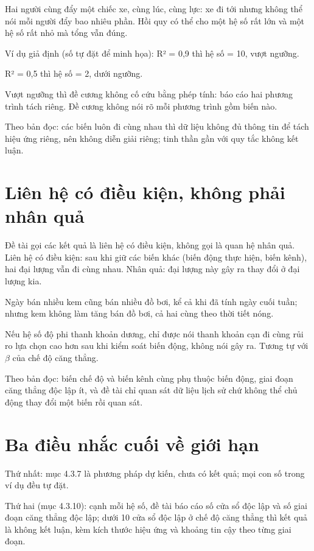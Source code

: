 Hai người cùng đẩy một chiếc xe, cùng lúc, cùng lực: xe đi tới nhưng không thể nói mỗi người đẩy bao nhiêu phần. Hồi quy có thể cho một hệ số rất lớn và một hệ số rất nhỏ mà tổng vẫn đúng.

\begin{tcolorbox}[breakable]
Ví dụ giả định (số tự đặt để minh họa): R² = 0,9 thì hệ số = 10, vượt ngưỡng.

R² = 0,5 thì hệ số = 2, dưới ngưỡng.
\end{tcolorbox}

Vượt ngưỡng thì đề cương không cố cứu bằng phép tính: báo cáo hai phương trình tách riêng. Đề cương không nói rõ mỗi phương trình gồm biến nào.

Theo bản đọc: các biến luôn đi cùng nhau thì dữ liệu không đủ thông tin để tách hiệu ứng riêng, nên không diễn giải riêng; tinh thần gần với quy tắc không kết luận.

\section{Liên hệ có điều kiện, không phải nhân quả}

Đề tài gọi các kết quả là liên hệ có điều kiện, không gọi là quan hệ nhân quả. Liên hệ có điều kiện: sau khi giữ các biến khác (biến động thực hiện, biến kênh), hai đại lượng vẫn đi cùng nhau. Nhân quả: đại lượng này gây ra thay đổi ở đại lượng kia.

Ngày bán nhiều kem cũng bán nhiều đồ bơi, kể cả khi đã tính ngày cuối tuần; nhưng kem không làm tăng bán đồ bơi, cả hai cùng theo thời tiết nóng.

Nếu hệ số độ phi thanh khoản dương, chỉ được nói thanh khoản cạn đi cùng rủi ro lựa chọn cao hơn sau khi kiểm soát biến động, không nói gây ra. Tương tự với \texorpdfstring{$\beta$}{beta} của chế độ căng thẳng.

Theo bản đọc: biến chế độ và biến kênh cùng phụ thuộc biến động, giai đoạn căng thẳng độc lập ít, và đề tài chỉ quan sát dữ liệu lịch sử chứ không thể chủ động thay đổi một biến rồi quan sát.

\section{Ba điều nhắc cuối về giới hạn}

Thứ nhất: mục 4.3.7 là phương pháp dự kiến, chưa có kết quả; mọi con số trong ví dụ đều tự đặt.

Thứ hai (mục 4.3.10): cạnh mỗi hệ số, đề tài báo cáo số cửa sổ độc lập và số giai đoạn căng thẳng độc lập; dưới 10 cửa sổ độc lập ở chế độ căng thẳng thì kết quả là không kết luận, kèm kích thước hiệu ứng và khoảng tin cậy theo từng giai đoạn.

